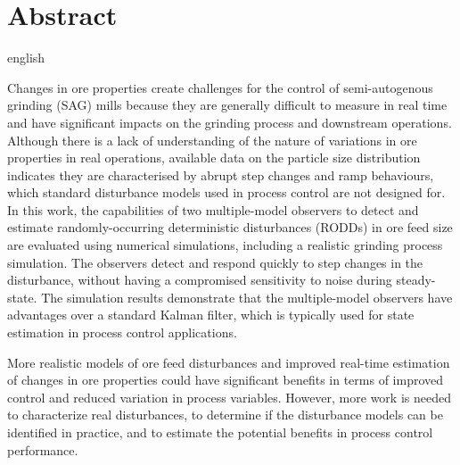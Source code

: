 \chapter*{Abstract}             %
\label{chap-abstract}           %

\begin{otherlanguage*}{english}
  
  Changes in ore properties create challenges for the control of semi-autogenous grinding (SAG) mills because they are generally difficult to measure in real time and have significant impacts on the grinding process and downstream operations. Although there is a lack of understanding of the nature of variations in ore properties in real operations, available data on the particle size distribution indicates they are characterised by abrupt step changes and ramp behaviours, which standard disturbance models used in process control are not designed for. In this work, the capabilities of two multiple-model observers to detect and estimate randomly-occurring deterministic disturbances (\gls{RODD}s) in ore feed size are evaluated using numerical simulations, including a realistic grinding process simulation. The observers detect and respond quickly to step changes in the disturbance, without having a compromised sensitivity to noise during steady-state. The simulation results demonstrate that the multiple-model observers have advantages over a standard Kalman filter, which is typically used for state estimation in process control applications. 
  
  More realistic models of ore feed disturbances and improved real-time estimation of changes in ore properties could have significant benefits in terms of improved control and reduced variation in process variables. However, more work is needed to characterize real disturbances, to determine if the disturbance models can be identified in practice, and to estimate the potential benefits in process control performance.
\end{otherlanguage*}
